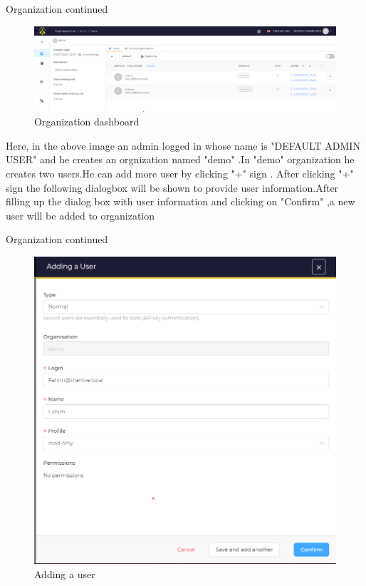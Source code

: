 \begin{frame}{Organization continued}

\begin{figure}[htp]
    \centering
    \includegraphics[scale = 0.28]{Organization_1.png}
    \caption{Organization dashboard}
    \label{fig:Organization dashboard}
\end{figure}

    
\begin{justify}

Here, in the above image an admin logged in whose name is "DEFAULT ADMIN USER"
and he creates an orgnization named "demo" .In "demo" organization he creates two users.He can add more user by clicking "+" sign . After clicking "+" sign the following dialogbox will be shown to provide user information.After filling up the dialog box with user information and clicking on "Confirm" ,a new user will be added to organization
           
\end{justify}


\end{frame}


\begin{frame}{Organization continued}

\begin{figure}[htp]
    \centering
    \includegraphics[scale = 0.28]{Organization_2_adding_a_user.png}
    \caption{Adding a user}
    \label{fig:Adding a user}
\end{figure}
        
\end{frame}


